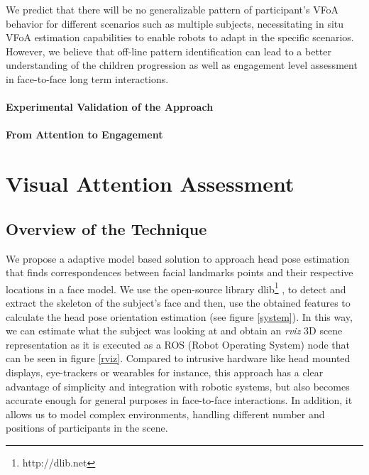 \documentclass{sig-alternate}
\begin{document}
We predict that there will be no generalizable pattern of participant's VFoA
behavior for different scenarios such as multiple subjects, necessitating in
situ VFoA estimation capabilities to enable robots to adapt in the specific
scenarios. However, we believe that off-line pattern identification can lead to
a better understanding of the children progression as well as engagement level
assessment in face-to-face long term interactions.



\paragraph{Experimental Validation of the Approach}


\paragraph{From Attention to Engagement}


\section{Visual Attention Assessment}

\subsection{Overview of the Technique}

We propose a adaptive model based solution to approach head pose estimation that
finds correspondences between facial landmarks points and their respective
locations in a face model. We use the open-source library
dlib\footnote{http://dlib.net} \cite{dlib09}, to detect and extract the skeleton
of the subject's face and then, use the obtained features to calculate the
head pose orientation estimation (see figure \ref{system}). In this way, we can
estimate what the subject was looking at and obtain an \textit{rviz} 3D scene
representation as it is executed as a ROS (Robot Operating System) node that can
be seen in figure \ref{rviz}. Compared to intrusive hardware like head mounted
displays, eye-trackers or wearables for instance, this approach has a clear
advantage of simplicity and integration with robotic systems, but also becomes
accurate enough for general purposes in face-to-face interactions. In addition,
it allows us to model complex environments, handling different number and
positions of participants in the scene.
\end{document}
